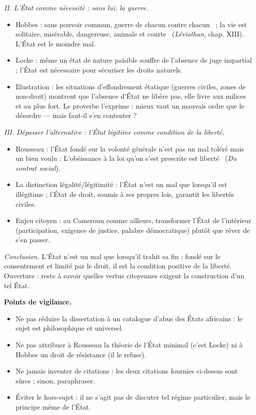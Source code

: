 \documentclass[11pt]{article}
\begin{document}
\begin{corrige}
\emph{II. L'État comme nécessité : sans lui, la guerre.}
\begin{itemize}
\item Hobbes : sans pouvoir commun, \guillemotleft guerre de chacun contre chacun \guillemotright\ ; la vie est \guillemotleft solitaire, misérable, dangereuse, animale et courte \guillemotright\ (\emph{Léviathan}, chap. XIII). L'État est le moindre mal.
\item Locke : même un état de nature paisible souffre de l'absence de juge impartial ; l'État est nécessaire pour sécuriser les droits naturels.
\item Illustration : les situations d'effondrement étatique (guerres civiles, zones de non-droit) montrent que l'absence d'État ne libère pas, elle livre aux milices et au plus fort. Le proverbe l'exprime : mieux vaut un mauvais ordre que le désordre — mais faut-il s'en contenter ?
\end{itemize}

\emph{III. Dépasser l'alternative : l'État légitime comme condition de la liberté.}
\begin{itemize}
\item Rousseau : l'État fondé sur la volonté générale n'est pas un mal toléré mais un bien voulu : \guillemotleft L'obéissance à la loi qu'on s'est prescrite est liberté \guillemotright\ (\emph{Du contrat social}).
\item La distinction légalité/légitimité : l'État n'est un mal que lorsqu'il est illégitime ; l'État de droit, soumis à ses propres lois, garantit les libertés civiles.
\item Enjeu citoyen : au Cameroun comme ailleurs, transformer l'État de l'intérieur (participation, exigence de justice, palabre démocratique) plutôt que rêver de s'en passer.
\end{itemize}

\emph{Conclusion.} L'État n'est un mal que lorsqu'il trahit sa fin ; fondé sur le consentement et limité par le droit, il est la condition positive de la liberté. Ouverture : reste à savoir quelles vertus citoyennes exigent la construction d'un tel État.

\textbf{Points de vigilance.}
\begin{itemize}
\item Ne pas réduire la dissertation à un catalogue d'abus des États africains : le sujet est philosophique et universel.
\item Ne pas attribuer à Rousseau la théorie de l'État minimal (c'est Locke) ni à Hobbes un droit de résistance (il le refuse).
\item Ne jamais inventer de citations : les deux citations fournies ci-dessus sont sûres ; sinon, paraphraser.
\item Éviter le hors-sujet : il ne s'agit pas de discuter tel régime particulier, mais le principe même de l'État.
\end{itemize}

\end{corrige}
\end{document}
